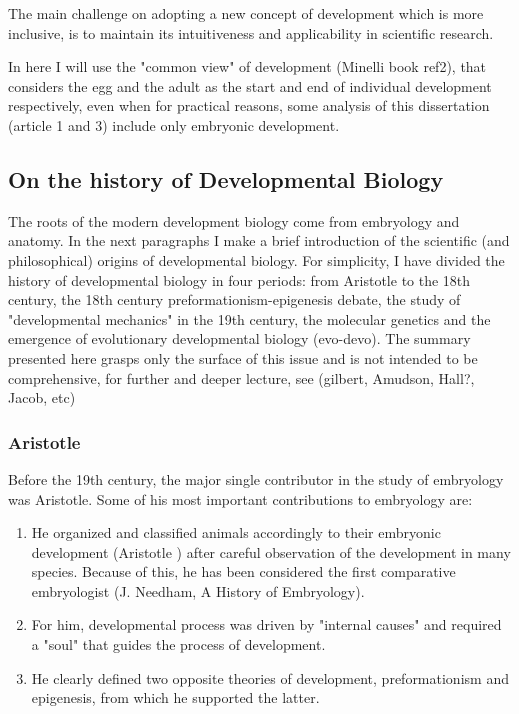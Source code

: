 The main challenge on adopting a new concept of development which is more inclusive, is to maintain its intuitiveness and applicability in scientific research.

In here I will use the "common view" of development (Minelli book ref2), that considers the egg and the adult as the start and end of individual development respectively, even when for practical reasons, some analysis of this dissertation (article 1 and 3) include only embryonic development. 


\subsection{On the history of Developmental Biology}

The roots of the modern development biology come from embryology and anatomy.
In the next paragraphs I make a brief introduction of the scientific (and philosophical) origins of developmental biology.
For simplicity, I have divided the history of developmental biology in four periods: from Aristotle to the 18th century, the 18th century preformationism-epigenesis debate, the study of "developmental mechanics" in the 19th century, the molecular genetics and the emergence of evolutionary developmental biology (evo-devo).
The summary presented here grasps only the surface of this issue and is not intended to be comprehensive, for further and deeper lecture, see (gilbert, Amudson, Hall?, Jacob, etc)


\subsubsection{Aristotle}
Before the 19th century, the major single contributor in the study of embryology was Aristotle. 
Some of his most important contributions to embryology are:

\begin{enumerate}
\item He organized and classified animals accordingly to their embryonic development (Aristotle ) after careful observation of the development in many species. Because of this, he has been considered the first comparative embryologist (J. Needham, A History of Embryology).
\item For him, developmental process was driven by "internal causes" and required a "soul" that guides the process of development.
\item He clearly defined two opposite theories of development, preformationism and epigenesis, from which he supported the latter.
\end{enumerate}

